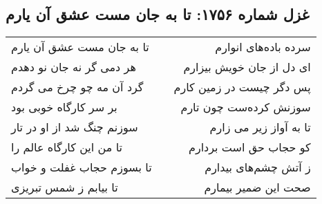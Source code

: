 \begin{center}
\section*{غزل شماره ۱۷۵۶: تا به جان مست عشق آن یارم}
\label{sec:1756}
\begin{longtable}{l p{0.5cm} r}
تا به جان مست عشق آن یارم
&&
سرده باده‌های انوارم
\\
هر دمی گر نه جان نو دهدم
&&
ای دل از جان خویش بیزارم
\\
گرد آن مه چو چرخ می گردم
&&
پس دگر چیست در زمین کارم
\\
بر سر کارگاه خوبی بود
&&
سوزنش کرده‌ست چون تارم
\\
سوزنم چنگ شد از او در تار
&&
تا به آواز زیر می زارم
\\
تا من این کارگاه عالم را
&&
کو حجاب حق است بردارم
\\
تا بسوزم حجاب غفلت و خواب
&&
ز آتش چشم‌های بیدارم
\\
تا بیابم ز شمس تبریزی
&&
صحت این ضمیر بیمارم
\\
\end{longtable}
\end{center}
